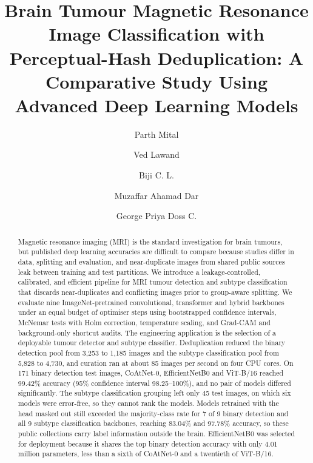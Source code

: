 \documentclass[a4paper,fleqn]{cas-sc}
\begin{document}


\title[mode=title]{Brain Tumour Magnetic Resonance Image Classification with Perceptual-Hash Deduplication: A Comparative Study Using Advanced Deep Learning Models}

\ifdefined\Anonymised
{}
\else
{}

\author[1]{Parth Mital}
\author[1]{Ved Lawand}
\author[1]{Biji C. L.}
\cormark[1]
\author[2]{Muzaffar Ahamad Dar}
\author[2]{George Priya Doss C.}


\fi

\begin{abstract}
Magnetic resonance imaging (MRI) is the standard investigation for brain tumours, but published deep learning accuracies are difficult to compare because studies differ in data, splitting and evaluation, and near-duplicate images from shared public sources leak between training and test partitions. We introduce a leakage-controlled, calibrated, and efficient pipeline for MRI tumour detection and subtype classification that discards near-duplicates and conflicting images prior to group-aware splitting. We evaluate nine ImageNet-pretrained convolutional, transformer and hybrid backbones under an equal budget of optimiser steps using bootstrapped confidence intervals, McNemar tests with Holm correction, temperature scaling, and Grad-CAM and background-only shortcut audits. The engineering application is the selection of a deployable tumour detector and subtype classifier. Deduplication reduced the binary detection pool from 3,253 to 1,185 images and the subtype classification pool from 5,828 to 4,730, and curation ran at about 85 images per second on four CPU cores. On 171 binary detection test images, CoAtNet-0, EfficientNetB0 and ViT-B/16 reached 99.42\% accuracy (95\% confidence interval 98.25--100\%), and no pair of models differed significantly. The subtype classification grouping left only 45 test images, on which six models were error-free, so they cannot rank the models. Models retrained with the head masked out still exceeded the majority-class rate for 7 of 9 binary detection and all 9 subtype classification backbones, reaching 83.04\% and 97.78\% accuracy, so these public collections carry label information outside the brain. EfficientNetB0 was selected for deployment because it shares the top binary detection accuracy with only 4.01 million parameters, less than a sixth of CoAtNet-0 and a twentieth of ViT-B/16.
\end{abstract}
\end{document}
